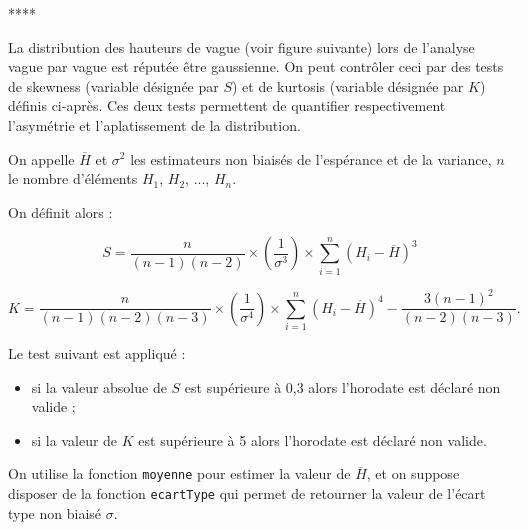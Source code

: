 ****


La distribution des hauteurs de vague (voir figure suivante) lors de l’analyse vague par vague est
réputée être gaussienne. On peut contrôler ceci par des tests de skewness (variable désignée par $S$)
et de kurtosis (variable désignée par $K$) définis ci-après. Ces deux tests permettent de quantifier
respectivement l’asymétrie et l’aplatissement de la distribution.

On appelle $\overline{H}$ et $\sigma^2$ les estimateurs non biaisés de l'espérance et de la variance, $n$ le nombre d'éléments $H_1$, $H_2$, ..., $H_n$.

On définit alors :

$$ S = \dfrac{n}{\left(n-1 \right)\left(n-2 \right)}\times \left( \dfrac{1}{\sigma^3}\right)\times \sum\limits_{i=1}^{n} \left(H_i - \overline{H} \right)^3
$$

$$ K = \dfrac{n}{\left(n-1 \right)\left(n-2 \right)\left(n-3 \right)}\times \left( \dfrac{1}{\sigma^4}\right)\times \sum\limits_{i=1}^{n} \left(H_i - \overline{H} \right)^4
-\dfrac{3\left(n-1 \right)^2}{\left(n-2 \right)\left(n-3 \right)}.
$$


Le test suivant est appliqué :
\begin{itemize}
\item si la valeur absolue de $S$ est supérieure à 0,3 alors l’horodate est déclaré non valide ;
\item si la valeur de $K$ est supérieure à 5 alors l’horodate est déclaré non valide.
\end{itemize}
On utilise la fonction \texttt{moyenne} pour estimer la valeur de $\overline{H}$, et on suppose disposer de la fonction
\texttt{ecartType} qui permet de retourner la valeur de l’écart type non biaisé $\sigma$.


